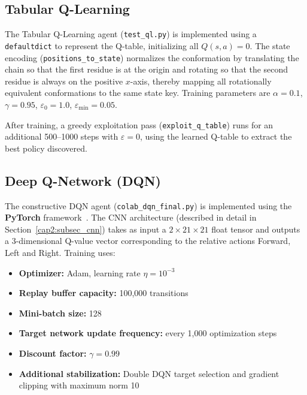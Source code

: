 \subsection{Tabular Q-Learning}
\label{cap4:subsec_ql_impl}

The Tabular Q-Learning agent (\texttt{test\_ql.py}) is implemented using a \texttt{defaultdict} to represent the Q-table, initializing all $Q(s, a) = 0$. The state encoding (\texttt{positions\_to\_state}) normalizes the conformation by translating the chain so that the first residue is at the origin and rotating so that the second residue is always on the positive $x$-axis, thereby mapping all rotationally equivalent conformations to the same state key. Training parameters are $\alpha = 0.1$, $\gamma = 0.95$, $\varepsilon_0 = 1.0$, $\varepsilon_{\min} = 0.05$.

After training, a greedy exploitation pass (\texttt{exploit\_q\_table}) runs for an additional 500--1000 steps with $\varepsilon = 0$, using the learned Q-table to extract the best policy discovered.

\subsection{Deep Q-Network (DQN)}
\label{cap4:subsec_dqn_impl}

The constructive DQN agent (\texttt{colab\_dqn\_final.py}) is implemented using the \textbf{PyTorch} framework~\cite{paszke2019pytorch}. The CNN architecture (described in detail in Section~\ref{cap2:subsec_cnn}) takes as input a $2 \times 21 \times 21$ float tensor and outputs a 3-dimensional Q-value vector corresponding to the relative actions Forward, Left and Right. Training uses:
\begin{itemize}
    \item \textbf{Optimizer:} Adam, learning rate $\eta = 10^{-3}$
    \item \textbf{Replay buffer capacity:} 100,000 transitions
    \item \textbf{Mini-batch size:} 128
    \item \textbf{Target network update frequency:} every 1,000 optimization steps
    \item \textbf{Discount factor:} $\gamma = 0.99$
    \item \textbf{Additional stabilization:} Double DQN target selection and gradient clipping with maximum norm 10
\end{itemize}

